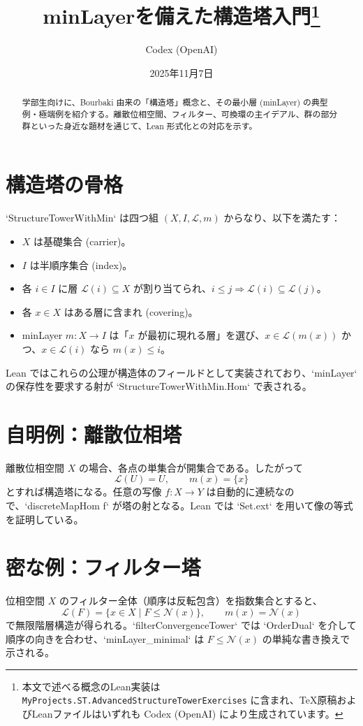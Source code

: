 \documentclass[a4paper]{ltjsarticle}
\title{minLayerを備えた構造塔入門\thanks{本文で述べる概念のLean実装は\texttt{MyProjects.ST.AdvancedStructureTowerExercises} に含まれ、TeX原稿およびLeanファイルはいずれも Codex (OpenAI) により生成されています。}}
\author{Codex (OpenAI)}
\date{2025年11月7日}
\theoremstyle{definition}
\theoremstyle{plain}
\theoremstyle{remark}
\begin{document}
\maketitle

\begin{abstract}
学部生向けに、Bourbaki 由来の「構造塔」概念と、その最小層 (minLayer) の典型例・極端例を紹介する。離散位相空間、フィルター、可換環の主イデアル、群の部分群といった身近な題材を通じて、Lean 形式化との対応を示す。
\end{abstract}

\section{構造塔の骨格}
`StructureTowerWithMin` は四つ組 $(X, I, \mathcal{L}, m)$ からなり、以下を満たす：
\begin{itemize}
  \item $X$ は基礎集合 (carrier)。
  \item $I$ は半順序集合 (index)。
  \item 各 $i \in I$ に層 $\mathcal{L}(i) \subseteq X$ が割り当てられ、$i \le j \Rightarrow \mathcal{L}(i) \subseteq \mathcal{L}(j)$。
  \item 各 $x \in X$ はある層に含まれ (covering)。
  \item minLayer $m : X \to I$ は「$x$ が最初に現れる層」を選び、$x \in \mathcal{L}(m(x))$ かつ、$x \in \mathcal{L}(i)$ なら $m(x) \le i$。
\end{itemize}
Lean ではこれらの公理が構造体のフィールドとして実装されており、`minLayer` の保存性を要求する射が `StructureTowerWithMin.Hom` で表される。

\section{自明例：離散位相塔}
離散位相空間 $X$ の場合、各点の単集合が開集合である。したがって
\[
\mathcal{L}(U)=U,\qquad m(x)=\{x\}
\]
とすれば構造塔になる。任意の写像 $f : X \to Y$ は自動的に連続なので、`discreteMapHom f` が塔の射となる。Lean では `Set.ext` を用いて像の等式を証明している。

\section{密な例：フィルター塔}
位相空間 $X$ のフィルター全体（順序は反転包含）を指数集合とすると、
\[
\mathcal{L}(F)=\{x \in X \mid F \le \mathcal{N}(x)\},\qquad m(x)=\mathcal{N}(x)
\]
で無限階層構造が得られる。`filterConvergenceTower` では `OrderDual` を介して順序の向きを合わせ、`minLayer_minimal` は $F \le \mathcal{N}(x)$ の単純な書き換えで示される。
\end{document}

